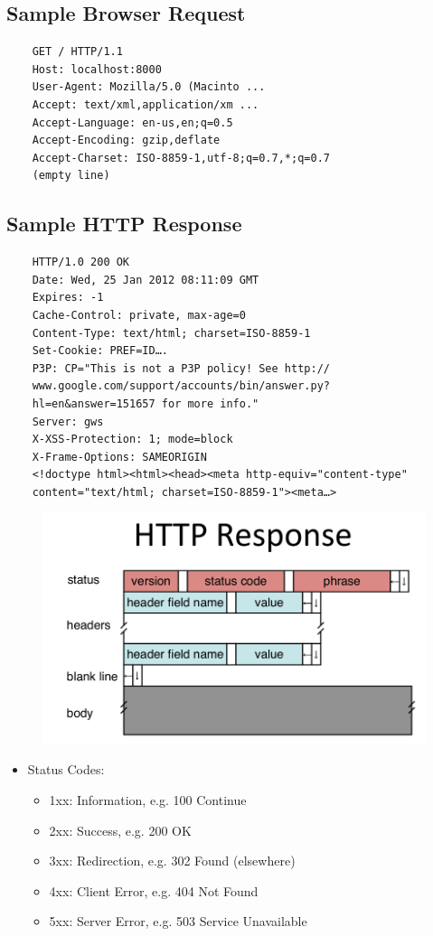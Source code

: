 \subsection{Sample Browser Request}
\begin{verbatim}
    GET / HTTP/1.1
    Host: localhost:8000
    User-Agent: Mozilla/5.0 (Macinto ...
    Accept: text/xml,application/xm ...
    Accept-Language: en-us,en;q=0.5
    Accept-Encoding: gzip,deflate
    Accept-Charset: ISO-8859-1,utf-8;q=0.7,*;q=0.7
    (empty line)
\end{verbatim}

\subsection{Sample HTTP Response}
\begin{verbatim}
    HTTP/1.0 200 OK
    Date: Wed, 25 Jan 2012 08:11:09 GMT
    Expires: -1
    Cache-Control: private, max-age=0
    Content-Type: text/html; charset=ISO-8859-1
    Set-Cookie: PREF=ID….
    P3P: CP="This is not a P3P policy! See http://
    www.google.com/support/accounts/bin/answer.py?
    hl=en&answer=151657 for more info."
    Server: gws
    X-XSS-Protection: 1; mode=block
    X-Frame-Options: SAMEORIGIN
    <!doctype html><html><head><meta http-equiv="content-type"
    content="text/html; charset=ISO-8859-1"><meta…>
\end{verbatim}
\begin{figure}[H]
    \includegraphics[width=\textwidth]{lazy/httpresponse.png}
\end{figure}
\begin{itemize}[nosep]
    \item Status Codes:
          \begin{itemize}[nosep]
              \item 1xx: Information, e.g. 100 Continue
              \item 2xx: Success, e.g. 200 OK
              \item 3xx: Redirection, e.g. 302 Found (elsewhere)
              \item 4xx: Client Error, e.g. 404 Not Found
              \item 5xx: Server Error, e.g. 503 Service Unavailable
          \end{itemize}
\end{itemize}
